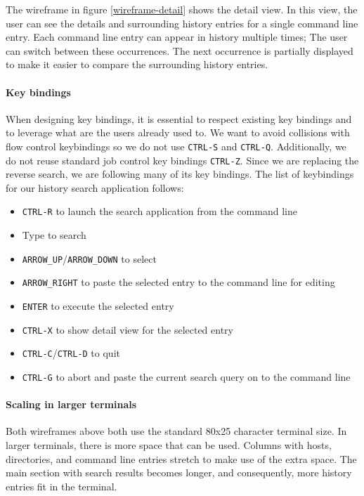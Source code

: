 The wireframe in figure \ref{wireframe-detail} shows the detail view. In this view, the user can see the details and surrounding history entries for a single command line entry. Each command line entry can appear in history multiple times; The user can switch between these occurrences. The next occurrence is partially displayed to make it easier to compare the surrounding history entries.



\paragraph{Key bindings}
When designing key bindings, it is essential to respect existing key bindings and to leverage what are the users already used to.
We want to avoid collisions with flow control keybindings so we do not use \verb|CTRL-S| and \verb|CTRL-Q|. Additionally, we do not reuse standard job control key bindings \verb|CTRL-Z|. 
Since we are replacing the reverse search, we are following many of its key bindings. The list of keybindings for our history search application follows:

\begin{itemize}
\item \verb|CTRL-R| to launch the search application from the command line
\item Type to search
\item \verb|ARROW_UP|/\verb|ARROW_DOWN| to select 
\item \verb|ARROW_RIGHT| to paste the selected entry to the command line for editing
\item \verb|ENTER| to execute the selected entry
\item \verb|CTRL-X| to show detail view for the selected entry
\item \verb|CTRL-C|/\verb|CTRL-D| to quit
\item \verb|CTRL-G| to abort and paste the current search query on to the command line
\end{itemize}


\paragraph{Scaling in larger terminals}

Both wireframes above both use the standard 80x25 character terminal size. In larger terminals, there is more space that can be used. Columns with hosts, directories, and command line entries stretch to make use of the extra space. The main section with search results becomes longer, and consequently, more history entries fit in the terminal. 


